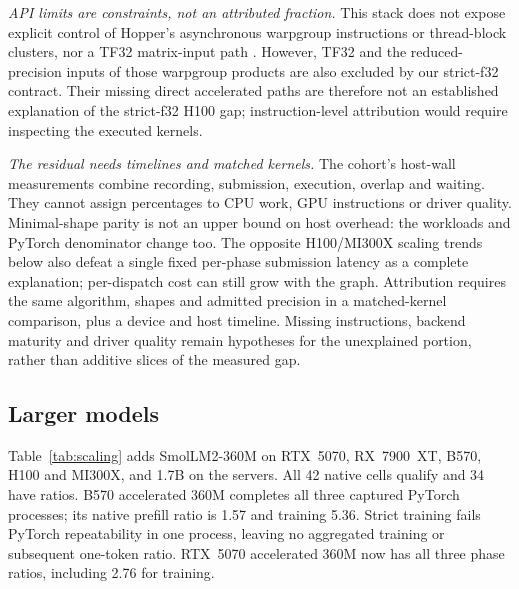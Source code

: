 \documentclass[conference]{IEEEtran}
\newcommand{\system}{Meganeura}
\begin{document}
\emph{API limits are constraints, not an attributed fraction.}
This stack does not expose explicit control of Hopper's asynchronous
warpgroup instructions or thread-block clusters, nor a TF32 matrix-input path
\cite{nvidia2026wgmma}. However, TF32 and the reduced-precision inputs of
those warpgroup products are also excluded by our strict-f32 contract.
Their missing direct accelerated paths are therefore not an established
explanation of the strict-f32 H100 gap; instruction-level attribution would
require inspecting the executed kernels.

\emph{The residual needs timelines and matched kernels.}
The cohort's host-wall measurements combine recording, submission, execution,
overlap and waiting. They cannot assign percentages to CPU work, GPU
instructions or driver quality. Minimal-shape parity is not an upper bound
on host overhead: the workloads and PyTorch denominator change too.
The opposite H100/MI300X scaling trends below also defeat a single fixed
per-phase submission latency as a complete explanation; per-dispatch cost
can still grow with the graph. Attribution requires the same algorithm,
shapes and admitted precision in a matched-kernel comparison, plus a device
and host timeline. Missing instructions, backend maturity and driver quality
remain hypotheses for the unexplained portion, rather than additive slices
of the measured gap.

\subsection{Larger models}
\label{sec:scaling}

\begin{table}[t]
\caption{SmolLM2 size study: \system{}'s time in ms and, in parentheses, its
ratio to PyTorch. S: strict, A: accelerated; -- means no qualified ratio.}
\label{tab:scaling}
\centering
\footnotesize
\setlength{\tabcolsep}{3pt}

\end{table}

Table~\ref{tab:scaling} adds SmolLM2-360M on RTX~5070, RX~7900~XT, B570,
H100 and MI300X, and 1.7B on the servers. All 42 native cells qualify and 34
have ratios. B570 accelerated 360M completes all three captured PyTorch
processes; its native prefill ratio is 1.57 and training 5.36. Strict
training fails PyTorch repeatability in one process, leaving no aggregated
training or subsequent one-token ratio. RTX~5070 accelerated 360M now has
all three phase ratios, including 2.76 for training.
\end{document}
